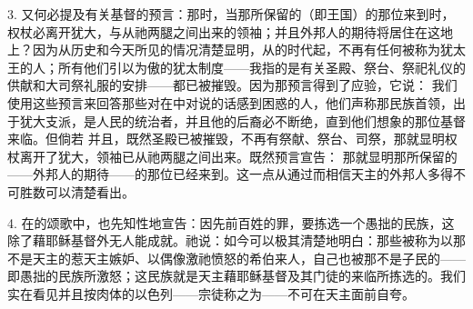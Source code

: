 3. 又何必提及有关基督的预言：那时，当那所保留的（即王国）的那位来到时，权杖必离开犹大，与从祂两腿之间出来的领袖；并且外邦人的期待将居住在这地上？因为从历史和今天所见的情况清楚显明，从的时代起，不再有任何被称为犹太王的人；所有他们引以为傲的犹太制度——我指的是有关圣殿、祭台、祭祀礼仪的供献和大司祭礼服的安排——都已被摧毁。因为那预言得到了应验，它说： 我们使用这些预言来回答那些对在中对说的话感到困惑的人，他们声称那民族首领，出于犹大支派，是人民的统治者，并且他的后裔必不断绝，直到他们想象的那位基督来临。但倘若 并且，既然圣殿已被摧毁，不再有祭献、祭台、司祭，那就显明权杖离开了犹大，领袖已从祂两腿之间出来。既然预言宣告： 那就显明那所保留的——外邦人的期待——的那位已经来到。这一点从通过而相信天主的外邦人多得不可胜数可以清楚看出。\par

4. 在的颂歌中，也先知性地宣告：因先前百姓的罪，要拣选一个愚拙的民族，这除了藉耶稣基督外无人能成就。祂说：如今可以极其清楚地明白：那些被称为以那不是天主的惹天主嫉妒、以偶像激祂愤怒的希伯来人，自己也被那不是子民的——即愚拙的民族所激怒；这民族就是天主藉耶稣基督及其门徒的来临所拣选的。我们实在看见并且按肉体的以色列——宗徒称之为——不可在天主面前自夸。\par

